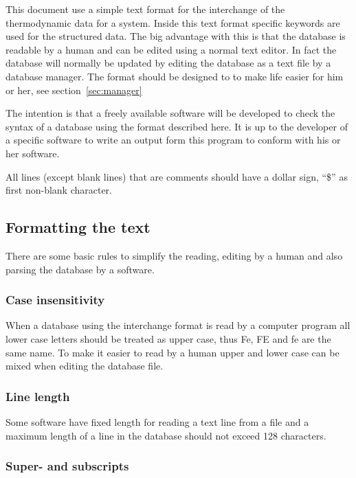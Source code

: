 \documentclass[12pt]{article}
\begin{document}
This document use a simple text format for the interchange of the
thermodynamic data for a system.  Inside this text format specific
keywords are used for the structured data.  The big advantage with
this is that the database is readable by a human and can be edited
using a normal text editor.  In fact the database will normally be
updated by editing the database as a text file by a database manager.
The format should be designed to to make life easier for him or her,
see section~\ref{sec:manager}

The intention is that a freely available software will be developed to
check the syntax of a database using the format described here.  It is
up to the developer of a specific software to write an output form
this program to conform with his or her software.

All lines (except blank lines) that are comments should have a dollar
sign, ``\$'' as first non-blank character.

\subsection{Formatting the text}

There are some basic rules to simplify the reading, editing by a human
and also parsing the database by a software.

\subsubsection{Case insensitivity}

When a database using the interchange format is read by a computer
program all lower case letters should be treated as upper case, thus
Fe, FE and fe are the same name.  To make it easier to read by a human
upper and lower case can be mixed when editing the database file.

\subsubsection{Line length}

Some software have fixed length for reading a text line from a file
and a maximum length of a line in the database should not exceed 128
characters.

\subsubsection{Super- and subscripts}
\end{document}
